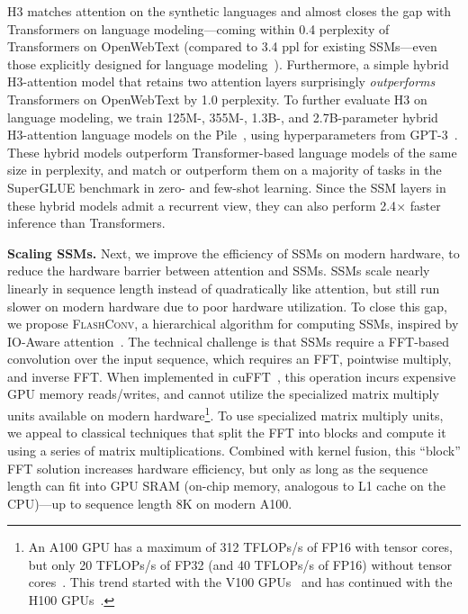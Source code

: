 \textsc{H3} matches attention on the synthetic languages and almost closes the gap with Transformers on language modeling---coming within 0.4 perplexity of Transformers on OpenWebText (compared to 3.4 ppl for existing SSMs---even those explicitly designed for language modeling~\citep{mehta2022long}). Furthermore, a simple hybrid \textsc{H3}-attention model that retains two attention layers surprisingly \textit{outperforms} Transformers on OpenWebText by 1.0 perplexity. To further evaluate \textsc{H3} on language modeling, we train 125M-, 355M-, 1.3B-, and 2.7B-parameter hybrid \textsc{H3}-attention language models on the Pile~\citep{gao2020pile}, using hyperparameters from GPT-3~\citep{brown2020language}. These hybrid models outperform Transformer-based language models of the same size in perplexity, and match or outperform them on a majority of tasks in the SuperGLUE benchmark in zero- and few-shot learning. Since the SSM layers in these hybrid models admit a recurrent view, they can also perform 2.4$\times$ faster inference than Transformers.

\textbf{Scaling SSMs.} Next, we improve the efficiency of SSMs on modern hardware, to reduce the hardware barrier between attention and SSMs. SSMs scale nearly linearly in sequence length instead of quadratically like attention, but still run slower on modern hardware due to poor hardware utilization. To close this gap, we propose \textsc{FlashConv}, a hierarchical algorithm for computing SSMs, inspired by IO-Aware attention~\citep{dao2022flashattention}. The technical challenge is that SSMs require a FFT-based convolution over the input sequence, which requires an FFT, pointwise multiply, and inverse FFT. When implemented in cuFFT~\citep{cufft}, this operation incurs expensive GPU memory reads/writes, and cannot utilize the specialized matrix multiply units available on modern hardware\footnote{An A100 GPU has a maximum of 312 TFLOPs/s of FP16 with tensor cores, but only 20 TFLOPs/s of FP32 (and 40 TFLOPs/s of FP16) without tensor cores~\citep{nvidia2020nvidia}. This trend started with the V100 GPUs~\citep{nvidia2017nvidia} and has continued with the H100 GPUs~\citep{nvidia2022nvidia}.}. To use specialized matrix multiply units, we appeal to classical techniques that split the FFT into blocks and compute it using a series of matrix multiplications. Combined with kernel fusion, this ``block'' FFT solution increases hardware efficiency, but only as long as the sequence length can fit into GPU SRAM (on-chip memory, analogous to L1 cache on the CPU)---up to sequence length 8K on modern A100.

